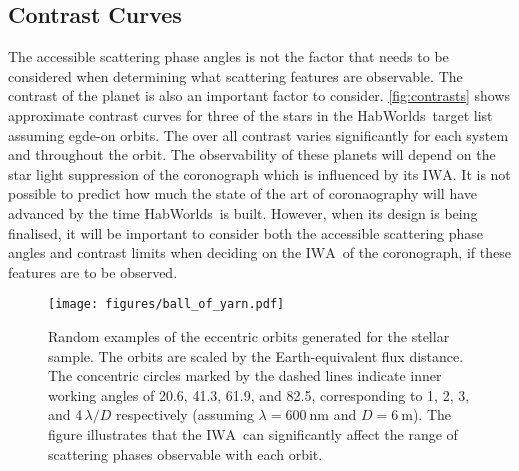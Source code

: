 \documentclass[
    usenatbib,
]{mnras}
\newcommand{\IWA}{\ensuremath{\mathrm{IWA}}}
\newcommand{\hwo}{HabWorlds}
\begin{document}

\subsection{Contrast Curves}
\label{sec:results_contrast}

The accessible scattering phase angles is not the factor that needs to be considered when determining what scattering features are observable. The contrast of the planet is also an important factor to consider. \cref{fig:contrasts} shows approximate contrast curves for three of the stars in the \hwo\ target list assuming egde-on orbits. The over all contrast varies significantly for each system and throughout the orbit. The observability of these planets will depend on the star light suppression of the coronograph which is influenced by its \IWA. It is not possible to predict how much the state of the art of coronaography will have advanced by the time \hwo\ is built. However, when its design is being finalised, it will be important to consider both the accessible scattering phase angles and contrast limits when deciding on the \IWA\ of the coronograph, if these features are to be observed.




\begin{figure*}
    \centering
    \texttt{[image: figures/ball\_of\_yarn.pdf]}  
    \caption{
        Random examples of the eccentric orbits generated for the stellar sample.
        The orbits are scaled by the Earth-equivalent flux distance. 
        The concentric circles marked by the dashed lines indicate inner working angles of 20.6, 41.3, 61.9, and \SI{82.5}{\mas}, corresponding to 1, 2, 3, and 4\,$\lambda / D$ respectively (assuming $\lambda = \SI{600}{\nano\meter}$ and $D = \SI{6}{\meter}$).
        The figure illustrates that the \IWA\ can significantly affect the range of scattering phases observable with each orbit.
    }
    \label{fig:ball-o-yarn}
\end{figure*}
 
\end{document}
